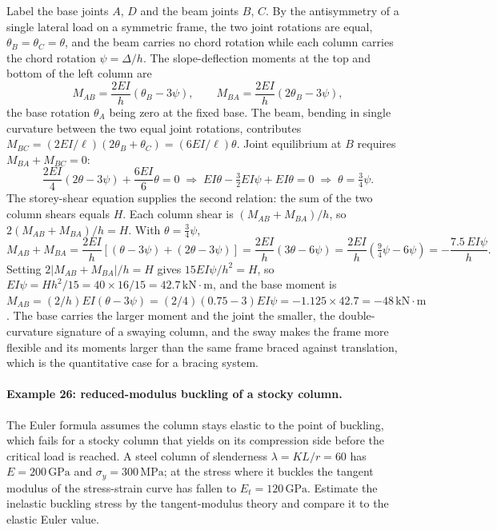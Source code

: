 Label the base joints $A$, $D$ and the beam joints $B$, $C$. By the
antisymmetry of a single lateral load on a symmetric frame, the two
joint rotations are equal, $\theta_B = \theta_C = \theta$, and the beam
carries no chord rotation while each column carries the chord rotation
$\psi = \Delta/h$. The slope-deflection moments at the top and bottom of
the left column are
\[
M_{AB} = \frac{2EI}{h}(\theta_B - 3\psi), \qquad
M_{BA} = \frac{2EI}{h}(2\theta_B - 3\psi),
\]
the base rotation $\theta_A$ being zero at the fixed base. The beam,
bending in single curvature between the two equal joint rotations,
contributes $M_{BC} = (2EI/\ell)(2\theta_B + \theta_C) = (6EI/\ell)
\theta$. Joint equilibrium at $B$ requires $M_{BA} + M_{BC} = 0$:
\[
\frac{2EI}{4}(2\theta - 3\psi) + \frac{6EI}{6}\theta = 0
\;\Rightarrow\;
EI\theta - \tfrac{3}{2}EI\psi + EI\theta = 0
\;\Rightarrow\;
\theta = \tfrac{3}{4}\psi.
\]
The storey-shear equation supplies the second relation: the sum of the
two column shears equals $H$. Each column shear is $(M_{AB} + M_{BA})/h$,
so $2(M_{AB} + M_{BA})/h = H$. With $\theta = \tfrac34\psi$,
\[
M_{AB} + M_{BA} = \frac{2EI}{h}\left[(\theta - 3\psi) + (2\theta - 3\psi)\right]
= \frac{2EI}{h}(3\theta - 6\psi)
= \frac{2EI}{h}\left(\tfrac{9}{4}\psi - 6\psi\right)
= -\frac{7.5\,EI\psi}{h}.
\]
Setting $2\lvert M_{AB} + M_{BA}\rvert/h = H$ gives $15 EI\psi/h^2 = H$,
so $EI\psi = H h^2/15 = 40 \times 16/15 = 42.7\,\text{kN}\cdot\text{m}$,
and the base moment is $M_{AB} = (2/h)EI(\theta - 3\psi) = (2/4)
(0.75 - 3)EI\psi = -1.125 \times 42.7 = -48\,\text{kN}\cdot\text{m}$.
The base carries the larger moment and the joint the smaller, the
double-curvature signature of a swaying column, and the sway makes the
frame more flexible and its moments larger than the same frame braced
against translation, which is the quantitative case for a bracing
system.



\paragraph{Example 26: reduced-modulus buckling of a stocky column.} The
Euler formula assumes the column stays elastic to the point of buckling,
which fails for a stocky column that yields on its compression side
before the critical load is reached. A steel column of slenderness
$\lambda = KL/r = 60$ has $E = 200\,\text{GPa}$ and $\sigma_y =
300\,\text{MPa}$; at the stress where it buckles the tangent modulus of
the stress-strain curve has fallen to $E_t = 120\,\text{GPa}$. Estimate
the inelastic buckling stress by the tangent-modulus theory and compare
it to the elastic Euler value.

